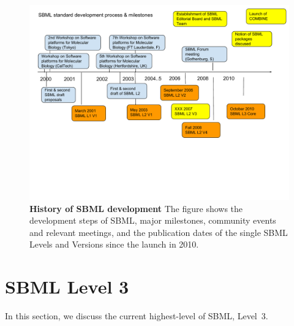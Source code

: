 


\begin{figure}[h]
\includegraphics[width=\textwidth]{res/sbmlHistory.pdf}
\caption{\textbf{History of SBML development} The figure shows the development steps of SBML, major milestones, community events and relevant meetings, and the publication dates of the single SBML Levels and Versions since the launch in 2010.}
\label{fig:history}
\end{figure}


\section{SBML Level 3}

In this section, we discuss the current highest-level of SBML, Level~3.

